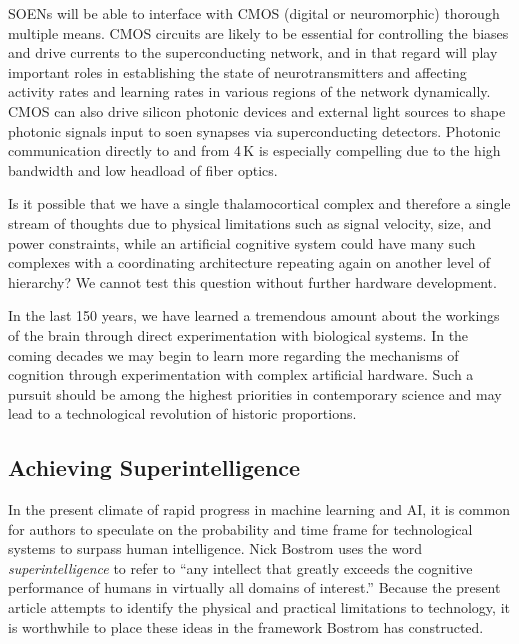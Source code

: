 SOENs will be able to interface with CMOS (digital or neuromorphic) thorough multiple means. CMOS circuits are likely to be essential for controlling the biases and drive currents to the superconducting network, and in that regard will play important roles in establishing the state of neurotransmitters and affecting activity rates and learning rates in various regions of the network dynamically. CMOS can also drive silicon photonic devices and external light sources to shape photonic signals input to soen synapses via superconducting detectors. Photonic communication directly to and from 4\,K is especially compelling due to the high bandwidth and low headload of fiber optics. 

\vspace{3em}
Is it possible that we have a single thalamocortical complex and therefore a single stream of thoughts due to physical limitations such as signal velocity, size, and power constraints, while an artificial cognitive system could have many such complexes with a coordinating architecture repeating again on another level of hierarchy? We cannot test this question without further hardware development.

\vspace{3em}
In the last 150 years, we have learned a tremendous amount about the workings of the brain through direct experimentation with biological systems. In the coming decades we may begin to learn more regarding the mechanisms of cognition through experimentation with complex artificial hardware. Such a pursuit should be among the highest priorities in contemporary science and may lead to a technological revolution of historic proportions.

\subsection{Achieving Superintelligence}
In the present climate of rapid progress in machine learning and AI, it is common for authors to speculate on the probability and time frame for technological systems to surpass human intelligence. Nick Bostrom uses the word \textit{superintelligence} to refer to ``any intellect that greatly exceeds the cognitive performance of humans in virtually all domains of interest.'' \cite{bo2014} Because the present article attempts to identify the physical and practical limitations to technology, it is worthwhile to place these ideas in the framework Bostrom has constructed.  

